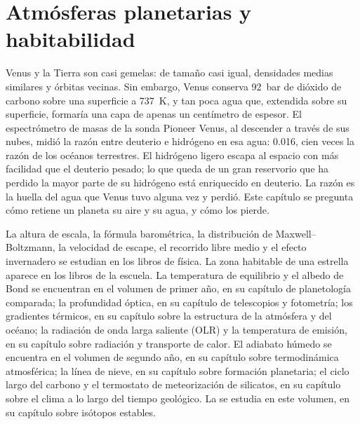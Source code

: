 \chapter{Atmósferas planetarias y habitabilidad}\label{ch:b3:planetary-atmospheres}

Venus y la Tierra son casi gemelas: de tamaño casi igual, densidades medias
similares y órbitas vecinas. Sin embargo, Venus conserva \qty{92}{bar} de dióxido de carbono
sobre una superficie a \qty{737}{K}, y tan poca agua que, extendida
sobre su superficie, formaría una capa de apenas un centímetro de espesor. El
espectrómetro de masas de la sonda Pioneer Venus, al descender a través de sus nubes,
midió la razón entre deuterio e hidrógeno en esa agua: \num{0.016},
cien veces la razón de los océanos terrestres. El hidrógeno ligero escapa al
espacio con más facilidad que el deuterio pesado; lo que queda de un gran reservorio
que ha perdido la mayor parte de su hidrógeno está enriquecido en deuterio. La razón es la
huella del agua que Venus tuvo alguna vez y perdió. Este capítulo se pregunta cómo
retiene un planeta su aire y su agua, y cómo los pierde.

\begin{recall}
La altura de escala, la fórmula barométrica, la distribución de Maxwell--Boltzmann,
la velocidad de escape, el recorrido libre medio y el efecto invernadero
se estudian en los libros de física. La zona habitable de una estrella
aparece en los libros de la escuela. La temperatura de equilibrio y el albedo de Bond
se encuentran en el volumen de primer año, en su capítulo de planetología comparada;
la profundidad óptica, en su capítulo de telescopios y fotometría;
los gradientes térmicos, en su capítulo sobre la estructura de la atmósfera y del océano;
la radiación de onda larga saliente (OLR) y la temperatura de emisión, en su
capítulo sobre radiación y transporte de calor. El adiabato húmedo se encuentra en el volumen de segundo año,
en su capítulo sobre termodinámica atmosférica; la línea de nieve, en su
capítulo sobre formación planetaria; el ciclo largo del carbono y el
termostato de meteorización de silicatos, en su capítulo sobre el clima a lo largo del
tiempo geológico. La  se estudia en este volumen, en su capítulo sobre
isótopos estables.
\end{recall}

